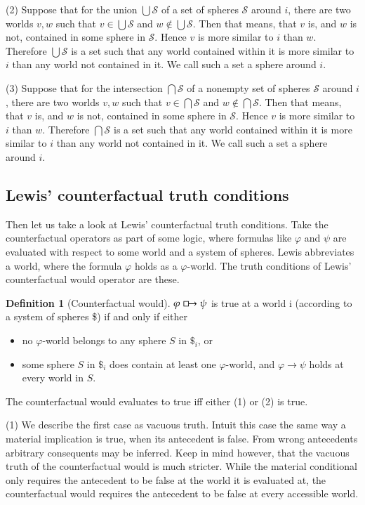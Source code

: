 \documentclass[a4paper,american,10pt]{paper}
\theoremstyle{definition}\newtheorem{definition}{Definition}
\begin{document}
(2) Suppose that for the union $\bigcup\mathscr{S}$ of a set of spheres $\mathscr{S}$ around $i$, there are two worlds $v,w$ such that $v\in\bigcup\mathscr{S}$ and $w\notin\bigcup\mathscr{S}$. Then that means, that $v$ is, and $w$ is not, contained in some sphere in $\mathscr{S}$. Hence $v$ is more similar to $i$ than $w$. Therefore $\bigcup\mathscr{S}$ is a set such that any world contained within it is more similar to $i$ than any world not contained in it. We call such a set a sphere around $i$.

(3) Suppose that for the intersection $\bigcap\mathscr{S}$ of a nonempty set of spheres $\mathscr{S}$ around $i$, there are two worlds $v,w$ such that $v\in\bigcap\mathscr{S}$ and $w\notin\bigcap\mathscr{S}$. Then that means, that $v$ is, and $w$ is not, contained in some sphere in $\mathscr{S}$. Hence $v$ is more similar to $i$ than $w$. Therefore $\bigcap\mathscr{S}$ is a set such that any world contained within it is more similar to $i$ than any world not contained in it. We call such a set a sphere around $i$.
\subsection{Lewis' counterfactual truth conditions}
Then let us take a look at Lewis' counterfactual truth conditions. Take the counterfactual operators as part of some logic, where formulas like $\varphi$ and $\psi$ are evaluated with respect to some world and a system of spheres. Lewis abbreviates a world, where the formula $\varphi$ holds as a $\varphi$-world. The truth conditions of Lewis' counterfactual would operator are these.
\begin{definition}[Counterfactual would]
	$\varphi\boxright\psi$ is true at a world i (according to a system of spheres \$) if and only if either
	\begin{itemize}
	\item[(1)] no $\varphi$-world belongs to any sphere $S$ in $\$_i$, or
	\item[(2)] some sphere $S$ in $\$_i$ does contain at least one $\varphi$-world, and $\varphi\rightarrow\psi$ holds at every world in $S$.
	\end{itemize}
	\label{def:counterfactual_would}
\end{definition}
\noindent The counterfactual would evaluates to true iff either (1) or (2) is true.

(1) We describe the first case as vacuous truth. Intuit this case the same way a material implication is true, when its antecedent is false. From wrong antecedents arbitrary consequents may be inferred. Keep in mind however, that the vacuous truth of the counterfactual would is much stricter. While the material conditional only requires the antecedent to be false at the world it is evaluated at, the counterfactual would requires the antecedent to be false at every accessible world.
\end{document}
